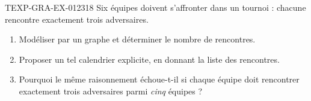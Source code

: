 \begin{exercice}{TEXP-GRA-EX-012}{3}{18}
Six équipes doivent s'affronter dans un tournoi : chacune rencontre exactement
trois adversaires.
\begin{enumerate}
  \item Modéliser par un graphe et déterminer le nombre de rencontres.
  \item Proposer un tel calendrier explicite, en donnant la liste des
        rencontres.
  \item Pourquoi le même raisonnement échoue-t-il si chaque équipe doit
        rencontrer exactement trois adversaires parmi \emph{cinq} équipes ?
\end{enumerate}
\end{exercice}
